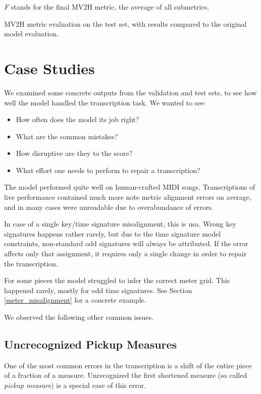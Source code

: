 $F$ stands for the final MV2H metric, the average of all submetrics.

\begin{table}[ht!]
\centering

\caption[MV2H metric evaluation on the test set.]{MV2H metric evaluation on the test set, with results compared to the original model evaluation.}
\end{table}

\section{Case Studies}

We examined some concrete outputs from the validation and test sets, to see how well the model handled the transcription task. We wanted to see: \begin{itemize}
	\item How often does the model its job right?
	\item What are the common mistakes?
	\item How disruptive are they to the score?
	\item What effort one needs to perform to repair a transcription?
\end{itemize}

The model performed quite well on human-crafted MIDI songs. Transcriptions of live performance contained much more note metric alignment errors on average, and in many cases were unreadable due to overabundance of errors.

In case of a single key/time signature misalignment, this is usa. Wrong key signatures happens rather rarely, but due to the time signature model constraints, non-standard odd signatures will always be attributed. If the error affects only that assignment, it requires only a single change in order to repair the transcription.

For some pieces the model struggled to infer the correct meter grid. This happened rarely, mostly for odd time signatures. See Section \ref{meter_misalignment} for a concrete example.

We observed the following other common issues.

\subsection{Uncrecognized Pickup Measures}

One of the most common errors in the transcription is a shift of the entire piece of a fraction of a measure. Unrecognized the first shortened measure (so called \emph{pickup measure}) is a special case of this error.

